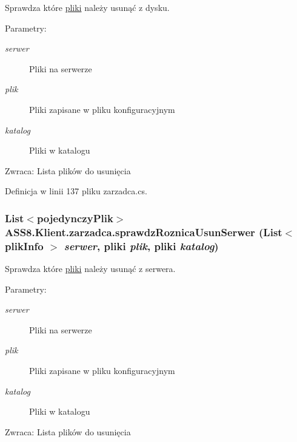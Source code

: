 Sprawdza które \hyperlink{a00017}{pliki} należy usunąć z dysku. 

\begin{Desc}
\item[Parametry:]
\begin{description}
\item[{\em serwer}]Pliki na serwerze\item[{\em plik}]Pliki zapisane w pliku konfiguracyjnym\item[{\em katalog}]Pliki w katalogu\end{description}
\end{Desc}
\begin{Desc}
\item[Zwraca:]Lista plików do usunięcia\end{Desc}


Definicja w linii 137 pliku zarzadca.cs.\hypertarget{a00037_e15914ff83794a5f6fb1e848c7640900}{
\subsubsection[{sprawdzRoznicaUsunSerwer}]{\setlength{\rightskip}{0pt plus 5cm}List$<${\bf pojedynczyPlik}$>$ ASS8.Klient.zarzadca.sprawdzRoznicaUsunSerwer (List$<$ {\bf plikInfo} $>$ {\em serwer}, \/  {\bf pliki} {\em plik}, \/  {\bf pliki} {\em katalog})}}
\label{d1/dc6/a00037_e15914ff83794a5f6fb1e848c7640900}


Sprawdza które \hyperlink{a00017}{pliki} należy usunąć z serwera. 

\begin{Desc}
\item[Parametry:]
\begin{description}
\item[{\em serwer}]Pliki na serwerze\item[{\em plik}]Pliki zapisane w pliku konfiguracyjnym\item[{\em katalog}]Pliki w katalogu\end{description}
\end{Desc}
\begin{Desc}
\item[Zwraca:]Lista plików do usunięcia\end{Desc}


